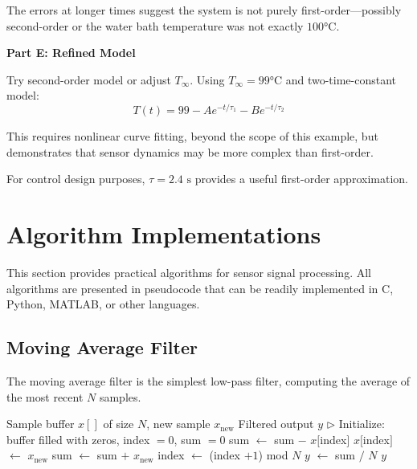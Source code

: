\begin{example}
The errors at longer times suggest the system is not purely first-order---possibly second-order or the water bath temperature was not exactly $100°\text{C}$.

\textbf{Part E: Refined Model}

Try second-order model or adjust $T_{\infty}$. Using $T_{\infty} = 99°\text{C}$ and two-time-constant model:
\begin{equation}
T(t) = 99 - Ae^{-t/\tau_1} - Be^{-t/\tau_2}
\end{equation}

This requires nonlinear curve fitting, beyond the scope of this example, but demonstrates that sensor dynamics may be more complex than first-order.

For control design purposes, $\tau = 2.4\text{ s}$ provides a useful first-order approximation.
\end{example}

\section{Algorithm Implementations}
\label{sec:algorithms}

This section provides practical algorithms for sensor signal processing. All algorithms are presented in pseudocode that can be readily implemented in C, Python, MATLAB, or other languages.

\subsection{Moving Average Filter}

The moving average filter is the simplest low-pass filter, computing the average of the most recent $N$ samples.

\begin{algorithm}[htbp]
\caption{Moving Average Filter}
\label{alg:moving_average}
\begin{algorithmic}
\REQUIRE Sample buffer $x[]$ of size $N$, new sample $x_{\text{new}}$
\ENSURE Filtered output $y$
\STATE $\triangleright$ Initialize: buffer filled with zeros, index $= 0$, sum $= 0$
\STATE sum $\leftarrow$ sum $-$ $x[$index$]$ 
\STATE $x[$index$]$ $\leftarrow$ $x_{\text{new}}$ 
\STATE sum $\leftarrow$ sum $+$ $x_{\text{new}}$ 
\STATE index $\leftarrow$ (index $+ 1$) mod $N$ 
\STATE $y$ $\leftarrow$ sum $/$ $N$ 
\RETURN $y$
\end{algorithmic}
\end{algorithm}


